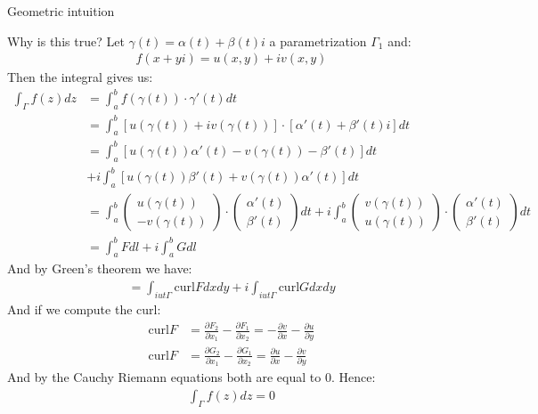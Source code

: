 \begin{parag}{Geometric intuition}
	\begin{subparag}{Why is this true?}
	    Let $\gamma\left(t\right) = \alpha\left(t\right) + \beta\left(t\right)i$ a parametrization $\Gamma_1$ and:
		\begin{align*} 
			f\left(x + yi\right) = u\left(x, y\right) + iv\left(x, y\right)
		\end{align*}
		Then the integral gives us:
		\begin{align*} 
			\int_\Gamma f\left(z\right)dz &= \int_a^b f\left(\gamma\left(t\right)\right) \cdot  \gamma'\left(t\right)dt\\
										  &= \int_a^b \left[u\left(\gamma\left(t\right)\right) + iv\left(\gamma\left(t\right)\right)\right] \cdot \left[\alpha'\left(t\right) + \beta'\left(t\right)i\right] dt\\
										  &= \int_a^b \left[u\left(\gamma\left(t\right)\right)\alpha'\left(t\right) - v\left(\gamma\left(t\right)\right) - \beta'\left(t\right)\right] dt \\
										  &+ i\int_a^b \left[u\left(\gamma\left(t\right)\right)\beta'\left(t\right) + v\left(\gamma\left(t\right)\right)\alpha'\left(t\right)\right]dt\\
										  &=  \int_a^b \begin{pmatrix} u\left(\gamma\left(t\right)\right) \\ -v\left(\gamma\left(t\right)\right) \end{pmatrix}  \cdot \begin{pmatrix} \alpha'\left(t\right) \\ \beta'\left(t\right) \end{pmatrix} dt + i \int_a^b \begin{pmatrix} v\left(\gamma\left(t\right)\right) \\ u\left(\gamma\left(t\right)\right) \end{pmatrix} \cdot \begin{pmatrix} \alpha'\left(t\right) \\ \beta'\left(t\right) \end{pmatrix} dt\\
			&= \int_a^b Fdl + i \int_a^b Gdl
		\end{align*}
		And by Green's theorem we have:
		\begin{align*} 
			= \int_{iut \Gamma} \text{curl}F dxdy + i \int_{iut \Gamma} \text{curl} G dxdy
		\end{align*}
		And if we compute the curl:
		\begin{align*} 
			\text{curl}F &= \frac{\partial F_2}{\partial x_1}  - \frac{\partial F_1}{\partial x_2}  = -\frac{\partial v}{\partial x}  - \frac{\partial u}{\partial y} \\
			\text{curl}F &= \frac{\partial G_2}{\partial x_1}  - \frac{\partial G_1}{\partial x_2}  = \frac{\partial u}{\partial x}  - \frac{\partial v}{\partial y} 
		\end{align*}
		And by the Cauchy Riemann equations both are equal to $0$. Hence: 
		\begin{align*} \int_\Gamma f\left(z\right)dz = 0 \end{align*}
		

\end{subparag}
\end{parag}
